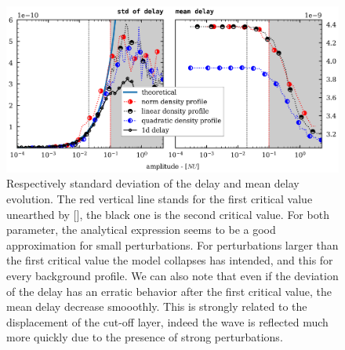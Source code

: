 \documentclass[11pt,a4paper]{report}
\begin{document}
\begin{figure}[H]
    \centering
    \includegraphics[width=1\linewidth]{./figures/delay_amp_norm_2.png}
    \caption{Respectively standard deviation of the delay and mean delay evolution. The red vertical line stands for the first critical value unearthed by [], the black one is the second critical value. For both parameter,
        the analytical expression seems to be a good approximation for small perturbations. For perturbations larger than the first critical value the model collapses has intended, and this for every background profile. We can also note that even if the deviation of the delay has an erratic behavior after the first critical value, the mean delay decrease smooothly.
        This is strongly related to the displacement of the cut-off layer, indeed the wave is reflected much more quickly due to the presence of strong perturbations.}
    \label{fig:barrier}
\end{figure}
\end{document}
